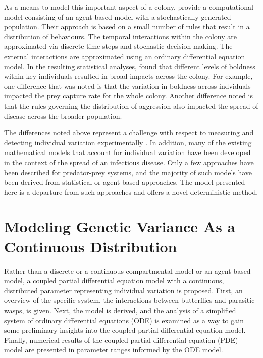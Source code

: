 \documentclass[review,authoryear]{elsarticle}
\begin{document}
As a means to model this important aspect of a colony, \cite{doi:10.1086/687235} provide a computational model
consisting of an agent based model with a stochastically generated
population. Their approach is based on a small number of rules that
result in a distribution of behaviours. The temporal interactions
within the colony are approximated via discrete time steps and
stochastic decision making. The external interactions are approximated
using an ordinary differential equation model.
In the resulting statistical analyses, \cite{doi:10.1086/687235} found that different levels of boldness
within key individuals resulted in broad impacts across the colony. For example, one difference that was noted is that the variation in
boldness across indviduals impacted the prey capture rate for the whole colony. Another difference noted is that
the rules governing the distribution of aggression also impacted the spread of disease across the broader population.

The differences noted above represent a challenge with respect to measuring and detecting individual variation experimentally \citep{doi:10.1037/0735-7036.107.3.250}. In addition, 
many of the existing mathematical models that account for individual variation have been
developed in the context of the spread of an infectious disease. Only
a few approaches have been described for predator-prey systems, and
the majority of such models have been derived from statistical or
agent based approaches. The model presented here is a departure from
such approaches and offers a novel deterministic method.


\section{Modeling Genetic Variance As a Continuous Distribution}

Rather than a discrete or a continuous compartmental model or an agent based model, a
coupled partial differential equation model with a continuous, distributed parameter representing individual variation is proposed. First, an overview of the specific system, the interactions
between butterflies and parasitic wasps, is given. Next, the
model is derived, and the analysis of a simplified system of
ordinary differential equations (ODE) is examined as a way to gain some
preliminary insights into the coupled partial differential equation model. Finally, numerical results of the coupled partial differential equation (PDE) model are presented in parameter ranges informed by the ODE model.
\end{document}
